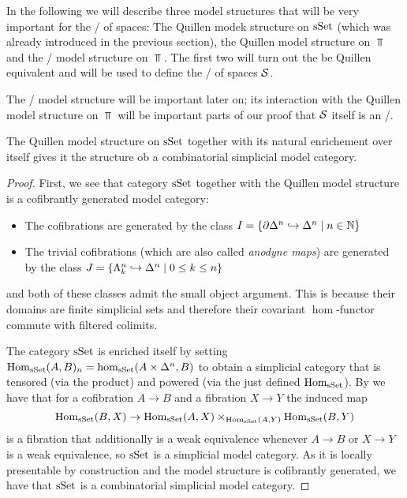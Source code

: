 In the following we will describe three model structures that will be very important for the \inftycat/ of spaces: The Quillen modek structure on $\operatorname{sSet}$ (which was already introduced in the previous section), the Quillen model structure on $\Top$ and the \Strom/ model structure on $\Top$.
The first two will turn out the be Quillen equivalent and will be used to define the \inftycat/ of spaces $\mathcal{S}$.

The \Strom/ model structure will be important later on; its interaction with the Quillen model structure on $\Top$ will be important parts of our proof that $\mathcal{S}$ itself is an \inftytop/.
\begin{prop}\label{prop:sSetCombSimpModelStructure}
    The Quillen model structure on $\operatorname{sSet}$ together with its natural enrichement over itself gives it the structure ob a combinatorial simplicial model category.
    \begin{proof}
        First, we see that category $\operatorname{sSet}$ together with the Quillen model structure is a cofibrantly generated model category:
    \begin{itemize}
        \item The cofibrations are generated by the class $I=\left\lbrace\partial\Delta^n\hookrightarrow \Delta^n\mid n\in\mathbb{N}\right\rbrace$
        \item The trivial cofibrations (which are also called \emph{anodyne maps}) are generated by the class $J=\left\lbrace\Lambda_k^n\hookrightarrow\Delta^n\mid 0\leq k\leq n\right\rbrace$
    \end{itemize}
    and both of these classes admit the small object argument.
    This is because their domains are finite simplicial sets and therefore their covariant $\hom$-functor commute with filtered colimits.

    The category $\operatorname{sSet}$ is enriched itself by setting $\operatorname{Hom}_{\operatorname{sSet}}(A,B)_n=\hom_{\operatorname{sSet}}(A\times\Delta^n,B)$ to obtain a simplicial category that is tensored (via the product) and powered (via the just defined $\operatorname{Hom}_{\operatorname{sSet}}$).
    By %
    we have that for a cofibration $A\to B$ and a fibration $X\to Y$ the induced map 
    \begin{equation*}
        \operatorname{Hom}_{\operatorname{sSet}}(B,X)\to\operatorname{Hom}_{\operatorname{sSet}}(A,X)\times_{\operatorname{Hom}_{\operatorname{sSet}}(A,Y)}\operatorname{Hom}_{\operatorname{sSet}}(B,Y)
    \end{equation*}
    is a fibration that additionally is a weak equivalence whenever $A\to B$ or $X\to Y$ is a weak equivalence, so $\operatorname{sSet}$ is a simplicial model category.
    As it is locally presentable by construction and the model structure is cofibrantly generated, we have that $\operatorname{sSet}$ is a combinatorial simplicial model category.
    \end{proof}
\end{prop}
